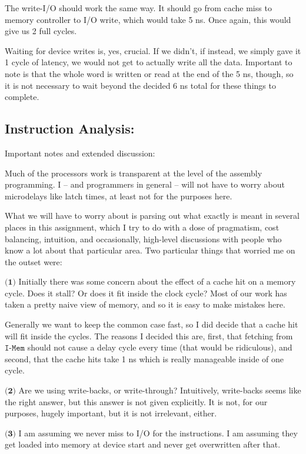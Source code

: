 \documentclass[a4paper]{article}
\begin{document}
The write-I/O should work the same way. It should go from cache miss to memory controller to I/O write, which would take 5 ns. Once again, this would give us 2 full cycles.

Waiting for device writes is, yes, crucial. If we didn't, if instead, we simply gave it 1 cycle of latency, we would not get to actually write all the data. Important to note is that the whole word is written or read at the end of the 5 ns, though, so it is not necessary to wait beyond the decided 6 ns total for these things to complete.

\subsection{Instruction Analysis:}

Important notes and extended discussion:

Much of the processors work is transparent at the level of the assembly programming. I -- and programmers in general -- will not have to worry about microdelays like latch times, at least not for the purposes here.

What we will have to worry about is parsing out what exactly is meant in several places in this assignment, which I try to do with a dose of pragmatism, cost balancing, intuition, and occasionally, high-level discussions with people who know a lot about that particular area. Two particular things that worried me on the outset were:

$\textbf{(1)}$ Initially there was some concern about the effect of a cache hit on a memory cycle. Does it stall? Or does it fit inside the clock cycle? Most of our work has taken a pretty naive view of memory, and so it is easy to make mistakes here.

Generally we want to keep the common case fast, so I did decide that a cache hit will fit inside the cycles. The reasons I decided this are, first, that fetching from $\texttt{I-Mem}$ should not cause a delay cycle every time (that would be ridiculous), and second, that the cache hits take 1 ns which is really manageable inside of one cycle.

$\textbf{(2)}$ Are we using write-backs, or write-through? Intuitively, write-backs seems like the right answer, but this answer is not given explicitly. It is not, for our purposes, hugely important, but it is not irrelevant, either.

$\textbf{(3)}$ I am assuming we never miss to I/O for the instructions. I am assuming they get loaded into memory at device start and never get overwritten after that.
\end{document}
